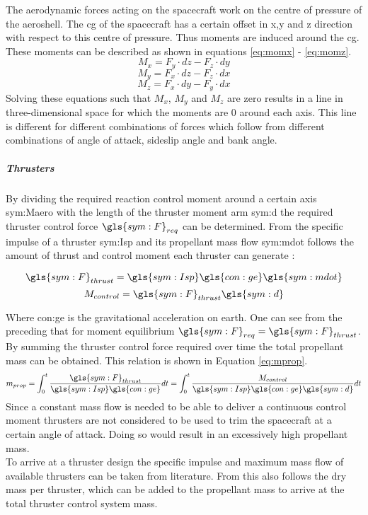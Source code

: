 The aerodynamic forces acting on the spacecraft work on the centre of pressure of the aeroshell. The \gls{cg} of the spacecraft has a certain offset in x,y and z direction with respect to this centre of pressure. Thus moments are induced around the \gls{cg}. These moments can be described as shown in equations \ref{eq:momx} - \ref{eq:momz}.
\begin{equation}
\label{eq:momx}
M_x = F_y \cdot dz - F_z \cdot dy
\end{equation}
\begin{equation}
\label{eq:momy}
M_y = F_x \cdot dz - F_z \cdot dx
\end{equation}
\begin{equation}
\label{eq:momz}
M_z = F_x \cdot dy - F_y \cdot dx
\end{equation}
Solving these equations such that $M_{x}$, $M_{y}$ and $M_{z}$ are zero results in a line in three-dimensional space for which the moments are 0 around each axis. This line is different for different combinations of forces which follow from different combinations of angle of attack, sideslip angle and bank angle.

\subparagraph{Thrusters}
\label{subpar:thrusters}

By dividing the required reaction control moment around a certain axis \gls{sym:Maero} with the length of the thruster moment arm \gls{sym:d} the required thruster control force $\gls{sym:F}_{req}$ can be determined. From the specific impulse of a thruster \gls{sym:Isp} and its propellant mass flow \gls{sym:mdot} follows the amount of thrust and control moment each thruster can generate \cite{Allen2012}:
\begin{multicols}{2}
\begin{equation}
\gls{sym:F}_{thrust}=\gls{sym:Isp}\gls{con:ge}\gls{sym:mdot}
\label{eq:Fthrust}
\end{equation}
\begin{equation} \label{eq:mcontrol}
M_{control}=\gls{sym:F}_{thrust}\gls{sym:d}
\end{equation}
\end{multicols}
Where \gls{con:ge} is the gravitational acceleration on earth. One can see from the preceding that for moment equilibrium $\gls{sym:F}_{req}=\gls{sym:F}_{thrust}$. By summing the thruster control force required over time the total propellant mass can be obtained. This relation is shown in Equation \ref{eq:mprop}.
\begin{equation}
m_{prop}=\int_{0}^{t} \frac{\gls{sym:F}_{thrust}}{\gls{sym:Isp}\gls{con:ge}} dt = \int_{0}^{t} \frac{M_{control}}{\gls{sym:Isp}\gls{con:ge}\gls{sym:d}} dt
\label{eq:mprop}
\end{equation}
Since a constant mass flow is needed to be able to deliver a continuous control moment thrusters are not considered to be used to trim the spacecraft at a certain angle of attack. Doing so would result in an excessively high propellant mass. \\
To arrive at a thruster design the specific impulse and maximum mass flow of available thrusters can be taken from literature. From this also follows the dry mass per thruster, which can be added to the propellant mass to arrive at the total thruster control system mass.

